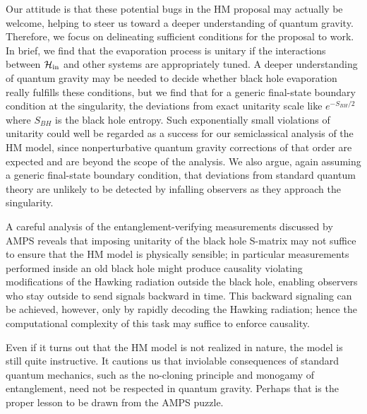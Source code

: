\documentclass[11pt]{article}
\begin{document}
Our attitude is that these potential bugs in the HM proposal may actually be welcome, helping to steer us toward a deeper understanding of quantum gravity. Therefore, we focus on delineating sufficient conditions for the proposal to work. In brief, we find that the evaporation process is unitary if the interactions between $\mathcal{H}_{\rm in}$ and other systems are appropriately tuned. A deeper understanding of quantum gravity may be needed to decide whether black hole evaporation really fulfills these conditions, but we find that for a generic final-state boundary condition at the singularity, the deviations from exact unitarity scale like $e^{-S_{BH}/2}$ where $S_{BH}$ is the black hole entropy. Such exponentially small violations of unitarity could well be regarded as a success for our semiclassical analysis of the HM model, since nonperturbative quantum gravity corrections of that order are expected and are beyond the scope of the analysis. We also argue, again assuming a generic final-state boundary condition, that deviations from standard quantum theory are unlikely to be detected by infalling observers as they approach the singularity. 

A careful analysis of the entanglement-verifying measurements discussed by AMPS reveals that imposing unitarity of the black hole S-matrix may not suffice to ensure that the HM model is physically sensible; in particular measurements performed inside an old black hole might produce causality violating modifications of the Hawking radiation outside the black hole, enabling observers who stay outside to send signals backward in time.  This backward signaling can be achieved, however, only by rapidly decoding the Hawking radiation; hence the computational complexity of this task \cite{harlow-hayden} may suffice to enforce causality.

Even if it turns out that the HM model is not realized in nature, the model is still quite instructive. It cautions us that inviolable consequences of standard quantum mechanics, such as the no-cloning principle and monogamy of entanglement, need not be respected in quantum gravity. Perhaps that is the proper lesson to be drawn from the AMPS puzzle. 
\end{document}
